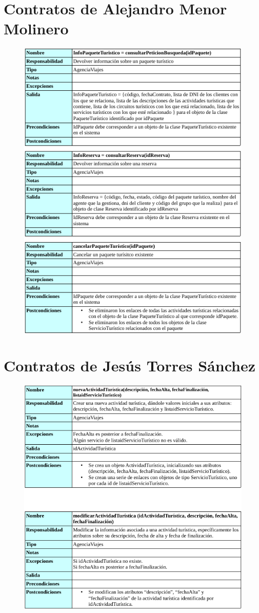 \documentclass{article}
\begin{document}
	\section{Contratos de Alejandro Menor Molinero}
	\begin{figure}[H]
		\centering
		\includegraphics[totalheight=18cm]{pag1alex}
	\end{figure}
	
	
	\section{Contratos de Jesús Torres Sánchez}
	\begin{figure}[H]
		\centering
		\includegraphics[totalheight=16cm]{pag1jesus}
	\end{figure}
	
\end{document}
